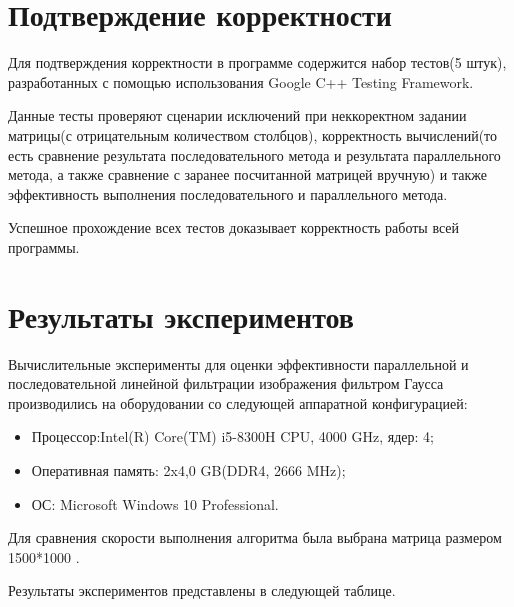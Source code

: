 \documentclass{report}
\begin{document}
\section*{Подтверждение корректности}
\par Для подтверждения корректности в программе содержится набор тестов(5 штук), разработанных с помощью использования Google C++ Testing Framework.
\par Данные тесты проверяют сценарии исключений при неккоректном задании матрицы(с отрицательным количеством столбцов), корректность вычислений(то есть сравнение результата последовательного метода и результата параллельного метода, а также сравнение с заранее посчитанной матрицей вручную) и также эффективность выполнения последовательного и параллельного метода.
\par Успешное прохождение всех тестов доказывает корректность работы всей программы.
\newpage

\section*{Результаты экспериментов}
Вычислительные эксперименты для оценки эффективности параллельной и последовательной линейной фильтрации изображения фильтром Гаусса производились на оборудовании со следующей аппаратной конфигурацией:

\begin{itemize}
\item Процессор:Intel(R) Core(TM) i5-8300H CPU, 4000 GHz, ядер: 4;
\item Оперативная память: 2x4,0 GB(DDR4, 2666 MHz);
\item ОС: Microsoft Windows 10 Professional.
\end{itemize}

\par Для сравнения скорости выполнения алгоритма была выбрана матрица размером 1500*1000 . 
\par Результаты экспериментов представлены в следующей таблице.
\end{document}
